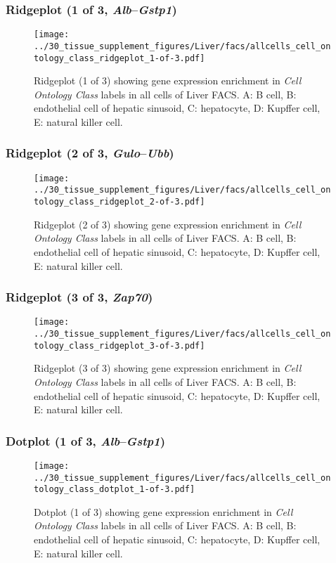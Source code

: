 \subsubsection{Ridgeplot (1 of 3, \emph{Alb}--\emph{Gstp1})}
\begin{figure}[h]
\centering
\texttt{[image: ../30\_tissue\_supplement\_figures/Liver/facs/allcells\_cell\_ontology\_class\_ridgeplot\_1-of-3.pdf]}

\caption{ Ridgeplot (1 of 3)  showing gene expression enrichment in \emph{Cell Ontology Class} labels in all cells of Liver FACS. A: B cell, B: endothelial cell of hepatic sinusoid, C: hepatocyte, D: Kupffer cell, E: natural killer cell.}
\end{figure}


\clearpage

\subsubsection{Ridgeplot (2 of 3, \emph{Gulo}--\emph{Ubb})}
\begin{figure}[h]
\centering
\texttt{[image: ../30\_tissue\_supplement\_figures/Liver/facs/allcells\_cell\_ontology\_class\_ridgeplot\_2-of-3.pdf]}

\caption{ Ridgeplot (2 of 3)  showing gene expression enrichment in \emph{Cell Ontology Class} labels in all cells of Liver FACS. A: B cell, B: endothelial cell of hepatic sinusoid, C: hepatocyte, D: Kupffer cell, E: natural killer cell.}
\end{figure}


\clearpage

\subsubsection{Ridgeplot (3 of 3, \emph{Zap70})}
\begin{figure}[h]
\centering
\texttt{[image: ../30\_tissue\_supplement\_figures/Liver/facs/allcells\_cell\_ontology\_class\_ridgeplot\_3-of-3.pdf]}

\caption{ Ridgeplot (3 of 3)  showing gene expression enrichment in \emph{Cell Ontology Class} labels in all cells of Liver FACS. A: B cell, B: endothelial cell of hepatic sinusoid, C: hepatocyte, D: Kupffer cell, E: natural killer cell.}
\end{figure}


\clearpage

\subsubsection{Dotplot (1 of 3, \emph{Alb}--\emph{Gstp1})}
\begin{figure}[h]
\centering
\texttt{[image: ../30\_tissue\_supplement\_figures/Liver/facs/allcells\_cell\_ontology\_class\_dotplot\_1-of-3.pdf]}

\caption{ Dotplot (1 of 3)  showing gene expression enrichment in \emph{Cell Ontology Class} labels in all cells of Liver FACS. A: B cell, B: endothelial cell of hepatic sinusoid, C: hepatocyte, D: Kupffer cell, E: natural killer cell.}
\end{figure}


